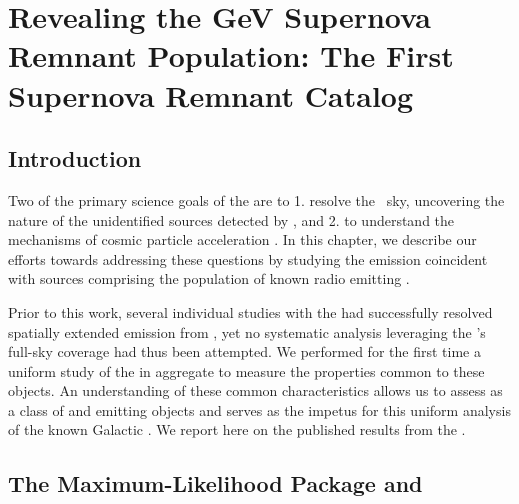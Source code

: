 \chapter{Revealing the GeV Supernova Remnant Population: The First \FermiLat{} Supernova Remnant Catalog}
\label{chap:snrcat}


\section{Introduction}\label{snrCat:Intro}
Two of the primary science goals of the \lat{}  are to 1. resolve the \gam~sky, uncovering the nature of the unidentified sources detected by \egret{}, and 2. to understand the mechanisms of cosmic particle acceleration \citep{atwood09}. In this chapter, we describe our efforts towards addressing these questions by studying the \gam{} emission coincident with sources comprising the population of known radio emitting \snrs{}.

Prior to this work, several individual studies with the \lat{} had successfully resolved spatially extended emission from \snrs{} \citep[and references therein]{3FGL}, yet no systematic analysis leveraging the \lat{}'s full-sky coverage had thus been attempted. We performed for the first time a uniform study of the \snrs{} in aggregate to measure the properties common to these objects. An understanding of these common characteristics allows us to assess \snrs{} as a class of \gam{} and \cray{} emitting objects and serves as the impetus for this uniform analysis of the known Galactic \snrs{}. We  report here on the published results from the \snrcat{} \citep{snrCat}.
 


\section{\label{snrcat:ptlk}The \ptlike{} Maximum-Likelihood Package and \srcs{}}

